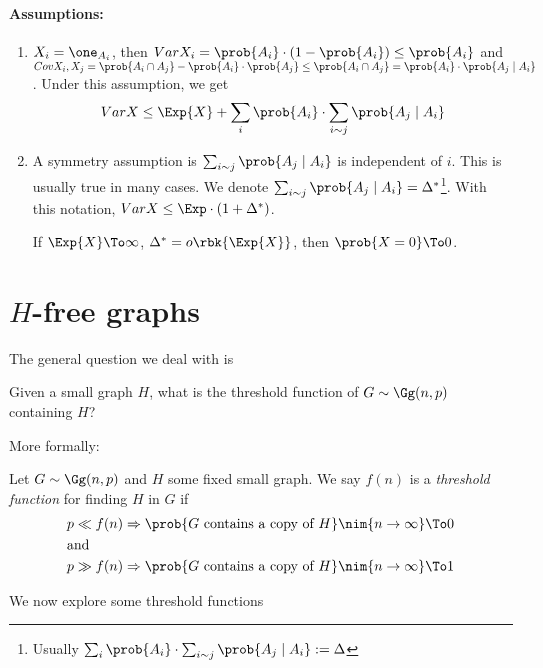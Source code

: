 \documentclass[a4paper, 11pt, oneside]{book}
\begin{document}
\paragraph{Assumptions:}
\begin{enumerate}
	\item $X_i = \one_{A_i}$, then $Var{X_i} = \prob{A_i}\cdot(1-\prob{A_i})\le \prob{A_i}$ and $Cov{X_i,X_j} = \prob{A_i\cap A_j} - \prob{A_i}\cdot \prob{A_j}\le \prob{A_i\cap A_j} = \prob{A_i}\cdot \prob{A_j\mid A_i}$. Under this assumption, we get 
	\[
	Var{X}\le \Exp{X} + \sum_i\prob{A_i}\cdot\sum_{i\sim j} \prob{A_j\mid A_i}
	\] 
	\item A symmetry assumption is $\sum_{i\sim j} \prob{A_j\mid A_i}$ is independent of $i$. This is usually true in many cases. We denote $\sum_{i\sim j} \prob{A_j\mid A_i} = \Delta^*$\footnote{Usually $ \sum_i\prob{A_i}\cdot\sum_{i\sim j} \prob{A_j\mid A_i} := \Delta$}. With this notation, $Var{X} \le \Exp\cdot(1+\Delta^*)$.
	\begin{cor}
	If $\Exp{X}	\To \infty$, $\Delta^* = o\rbk{\Exp{X}}$, then $\prob{X=0}\To 0$.
	\end{cor}
\end{enumerate}
\section{$H$-free graphs}
The general question we deal with is
\begin{question}
	Given a small graph $H$, what is the threshold function of $G\sim \Gg(n,p)$ containing $H$?
\end{question}
More formally:
\begin{yellowBox}
\begin{defn}
	 Let $G\sim \Gg(n,p)$ and $H$ some fixed small graph. We say $f(n)$ is a \emph{threshold function} for finding $H$ in $G$ if
	\begin{align*}
		& p\ll f(n) \Rightarrow \prob{G\text{ contains a copy of }H}\nim{n\to\infty}\To 0 \\
		&{\text{\centering and}} \\
		&p\gg f(n) \Rightarrow \prob{G\text{ contains a copy of }H}\nim{n\to\infty}\To 1 \\
	\end{align*}
\end{defn}	
\end{yellowBox}
We now explore some threshold functions
\end{document}
